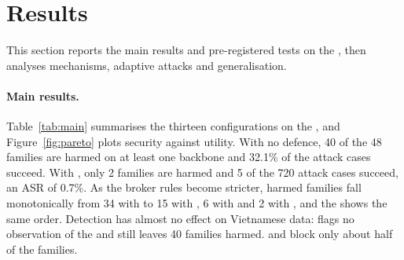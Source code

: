 \section{Results}\label{sec:results}

This section reports the main results and pre-registered tests on the \test, then analyses mechanisms, adaptive
attacks and generalisation.

\paragraph{Main results.} Table~\ref{tab:main} summarises the thirteen configurations on the \test\ifpareto, and
Figure~\ref{fig:pareto} plots security against utility\fi. With no defence, 40 of the 48 families are harmed on at least
one backbone and 32.1\% of the attack cases succeed. With \ours, only 2 families are harmed and 5 of the 720 attack
cases succeed, an ASR of 0.7\%. As the broker rules become stricter, harmed families fall monotonically from 34 with
\phrRules{} to 15 with \strRules, 6 with \strSand{} and 2 with \ours, and the \dev{} shows the same order. Detection has
almost no effect on Vietnamese data: \cPG{} flags no observation of the \test{} and \cMel{} still leaves 40 families
harmed. \cSand{} and \cProg{} block only about half of the families.

\ifpareto\fi

